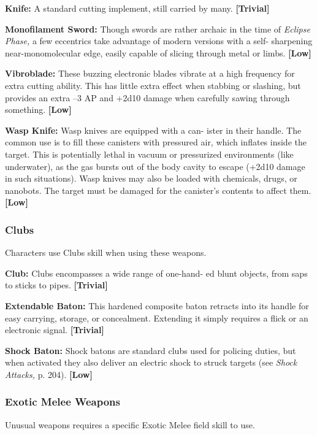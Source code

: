 \textbf{Knife:} A standard cutting implement, still carried 
by many. \textbf{[Trivial]}

\textbf{Monofilament  Sword:} Though swords are rather 
archaic in the time of \textit{Eclipse Phase,} a few eccentrics 
take advantage of modern versions with a self-
sharpening near-monomolecular edge, easily capable 
of slicing through metal or limbs. \textbf{[Low]}

\textbf{Vibroblade:} These buzzing electronic blades vibrate 
at a high frequency for extra cutting ability. This 
has little extra effect when stabbing or slashing, but 
provides an extra –3 AP and +2d10 damage when 
carefully sawing through something. \textbf{[Low]}

\textbf{Wasp Knife:} Wasp knives are equipped with a can-
ister in their handle. The common use is to fill these 
canisters with pressured air, which inflates  inside 
the target. This is potentially lethal in vacuum or 
pressurized environments (like underwater), as the 
gas bursts out of the body cavity to escape (+2d10 
damage in such situations). Wasp knives may also 
be loaded with chemicals, drugs, or nanobots. The 
target must be damaged for the canister's contents to 
affect them. \textbf{[Low]}

\subsubsection{Clubs}

Characters use Clubs skill when using these weapons.

\textbf{Club:} Clubs encompasses a wide range of one-hand-
ed blunt objects, from saps to sticks to pipes. \textbf{[Trivial]}

\textbf{Extendable Baton:} This hardened composite baton 
retracts into its handle for easy carrying, storage, or 
concealment. Extending it simply requires a flick or 
an electronic signal. \textbf{[Trivial]}

\textbf{Shock Baton:} Shock batons are standard clubs 
used for policing duties, but when activated they also 
deliver an electric shock to struck targets (see \textit{Shock }
\textit{Attacks,} p. 204). \textbf{[Low]}

\subsubsection{Exotic Melee Weapons}

Unusual weapons requires a specific Exotic Melee 
field skill to use.

